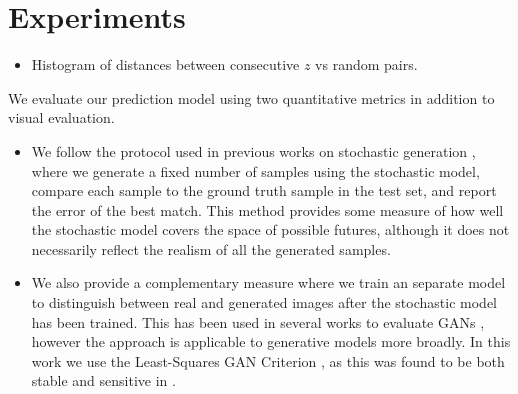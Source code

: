 \documentclass{article}
\begin{document}
\section{Experiments}

\begin{itemize}
\item Histogram of distances between consecutive $z$ vs random pairs.
\end{itemize}

We evaluate our prediction model using two quantitative metrics in addition to visual evaluation.
\begin{itemize}
\item We follow the protocol used in previous works on stochastic generation \citep{Walker2016, Babaeizadeh2018, Denton2018}, where we generate a fixed number of samples using the stochastic model, compare each sample to the ground truth sample in the test set, and report the error of the best match.
  This method provides some measure of how well the stochastic model covers the space of possible futures, although it does not necessarily reflect the realism of all the generated samples.
\item We also provide a complementary measure where we train an separate model to distinguish between real and generated images after the stochastic model has been trained. This has been used in several works to evaluate GANs \citep{Danihelka17, Rosca17, GANeval}, however the approach is applicable to generative models more broadly. In this work we use the Least-Squares GAN Criterion \citep{Mao16}, as this was found to be both stable and sensitive in \citep{GANeval}.
\end{itemize}
\end{document}
